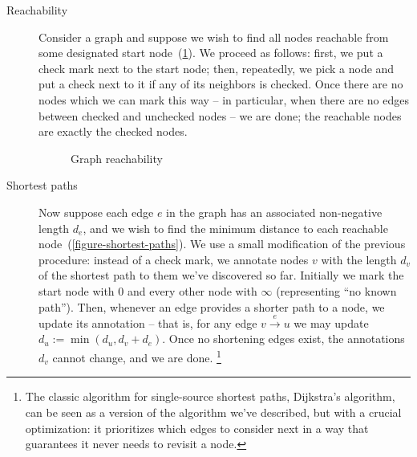 \begin{description}


\item[Reachability] %
%
Consider a graph and suppose we wish to find all nodes reachable from some
designated start node~(\cref{figure-reachability}). We proceed as follows:
first, we put a check mark next to the start node; then, repeatedly, we pick a
node and put a check next to it if any of its neighbors is checked. Once there
are no nodes which we can mark this way -- in particular, when there are no
edges between checked and unchecked nodes -- we are done; the reachable nodes
are exactly the checked nodes.



\begin{figure}[pth]
  \centering
  \XXX
  \caption{Graph reachability}
  \label{figure-reachability}
\end{figure}


\item[Shortest paths]
%
Now suppose each edge $e$ in the graph has an associated non-negative length
$d_e$, and we wish to find the minimum distance to each reachable
node~(\cref{figure-shortest-paths}). We use a small modification of the previous
procedure: instead of a check mark, we annotate nodes $v$ with the length $d_v$
of the shortest path to them we've discovered so far. Initially we mark the
start node with 0 and every other node with $\infty$ (representing ``no known
path'').
%
%
%
Then, whenever an edge provides a shorter path to a node, we update its
annotation -- that is, for any edge $v \xrightarrow{e} u$ we may update $d_u :=
\min(d_u, d_v + d_e)$.
%
Once no shortening edges exist, the annotations $d_v$ cannot change, and we are done.%
%
%
\footnote{The classic algorithm for single-source shortest paths, Dijkstra's
  algorithm, can be seen as a version of the algorithm we've described, but with
  a crucial optimization: it prioritizes which edges to consider next in a
  way that guarantees it never needs to revisit a node.}


\end{description}
